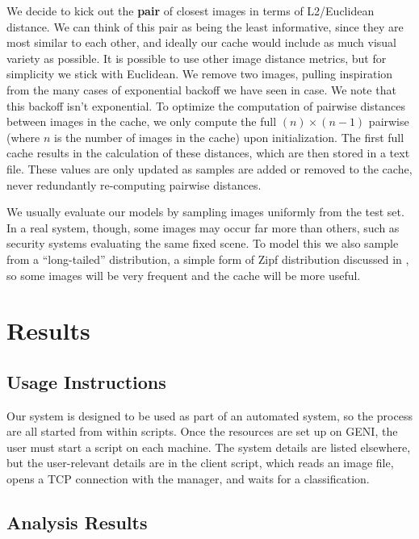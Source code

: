 \documentclass[12pt]{article}
\begin{document}
We decide to kick out the \textbf{pair} of closest images in terms of L2/Euclidean distance. We can think of this pair as being the least informative, since they are most similar to each other, and ideally our cache would include as much visual variety as possible. It is possible to use other image distance metrics, but for simplicity we stick with Euclidean. We remove two images, pulling inspiration from the many cases of exponential backoff we have seen in case. We note that this backoff isn't exponential. To optimize the computation of pairwise distances between images in the cache, we only compute the full $(n) \times (n-1)$ pairwise (where $n$ is the number of images in the cache) upon initialization. The first full cache results in the calculation of these distances, which are then stored in a text file. These values are only updated as samples are added or removed to the cache, never redundantly re-computing pairwise distances.

We usually evaluate our models by sampling images uniformly from the test set.
In a real system, though, some images may occur far more than others, such as security systems evaluating the same fixed scene.
To model this we also sample from a ``long-tailed'' distribution, a simple form of Zipf distribution discussed in \cite{mitzenmacher}, so some images will be very frequent and the cache will be more useful.

\section{Results}

\subsection{Usage Instructions}

Our system is designed to be used as part of an automated system, so the process are all started from within scripts.
Once the resources are set up on GENI, the user must start a script on each machine.
The system details are listed elsewhere, but the user-relevant details are in the client script, which reads an image file, opens a TCP connection with the manager, and waits for a classification.

\subsection{Analysis Results}
\end{document}
